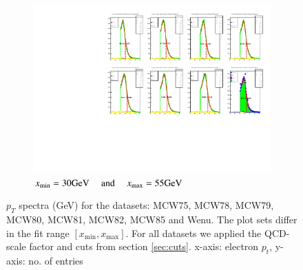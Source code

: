 \documentclass[11pt,a4paper,notitlepage]{scrartcl}
\begin{document}
\begin{figure}[H]\ContinuedFloat
	\centering
	\begin{subfigure}{\linewidth}
		\includegraphics[width=\linewidth]{P1_pics/gauge/gauge_xmin_30_xmax_55.pdf}
		\caption{$x_\text{min}=30\text{GeV} \text{\phantom{ n } and \phantom{ n }} x_{\text{max}}=55\text{GeV}$}
	\end{subfigure}
	\caption{$p_T$ spectra (GeV) for the datasets: MCW75, MCW78, MCW79, MCW80, MCW81, MCW82, MCW85 and Wenu. The plot sets differ in the fit range $[x_\text{min}, x_\text{max}]$. For all datasets we applied the QCD-scale factor and cuts from section \ref{sec:cuts}.  x-axis: electron $p_t$, y-axis: no. of entries}\label{fig:boundaries}
\end{figure}
\vspace{-0.5cm}
\end{document}
